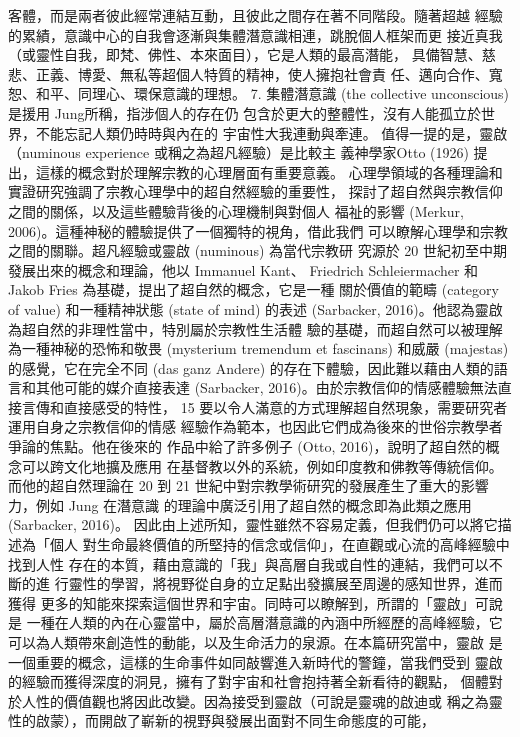 客體，而是兩者彼此經常連結互動，且彼此之間存在著不同階段。隨著超越
經驗的累績，意識中心的自我會逐漸與集體潛意識相連，跳脫個人框架而更
接近真我（或靈性自我，即梵、佛性、本來面目），它是人類的最高潛能，
具備智慧、慈悲、正義、博愛、無私等超個人特質的精神，使人擁抱社會責
任、邁向合作、寬恕、和平、同理心、環保意識的理想。 
7. 集體潛意識 (the collective unconscious) 是援用 Jung所稱，指涉個人的存在仍
包含於更大的整體性，沒有人能孤立於世界，不能忘記人類仍時時與內在的
宇宙性大我連動與牽連。 
值得一提的是，靈啟（numinous experience 或稱之為超凡經驗）是比較主
義神學家Otto (1926) 提出，這樣的概念對於理解宗教的心理層面有重要意義。
心理學領域的各種理論和實證研究強調了宗教心理學中的超自然經驗的重要性，
探討了超自然與宗教信仰之間的關係，以及這些體驗背後的心理機制與對個人
福祉的影響 (Merkur, 2006)。這種神秘的體驗提供了一個獨特的視角，借此我們
可以瞭解心理學和宗教之間的關聯。超凡經驗或靈啟 (numinous) 為當代宗教研
究源於 20 世紀初至中期發展出來的概念和理論，他以 Immanuel Kant、
Friedrich Schleiermacher 和 Jakob Fries 為基礎，提出了超自然的概念，它是一種
關於價值的範疇 (category of value) 和一種精神狀態 (state of mind) 的表述 
(Sarbacker, 2016)。他認為靈啟為超自然的非理性當中，特別屬於宗教性生活體
驗的基礎，而超自然可以被理解為一種神秘的恐怖和敬畏 (mysterium 
tremendum et fascinans) 和威嚴 (majestas) 的感覺，它在完全不同 (das ganz 
Andere) 的存在下體驗，因此難以藉由人類的語言和其他可能的媒介直接表達 
(Sarbacker, 2016)。由於宗教信仰的情感體驗無法直接言傳和直接感受的特性，
15 
要以令人滿意的方式理解超自然現象，需要研究者運用自身之宗教信仰的情感
經驗作為範本，也因此它們成為後來的世俗宗教學者爭論的焦點。他在後來的
作品中給了許多例子 (Otto, 2016)，說明了超自然的概念可以跨文化地擴及應用
在基督教以外的系統，例如印度教和佛教等傳統信仰。而他的超自然理論在 20
到 21 世紀中對宗教學術研究的發展產生了重大的影響力，例如 Jung 在潛意識
的理論中廣泛引用了超自然的概念即為此類之應用  (Sarbacker, 2016)。 
因此由上述所知，靈性雖然不容易定義，但我們仍可以將它描述為「個人
對生命最終價值的所堅持的信念或信仰」，在直觀或心流的高峰經驗中找到人性
存在的本質，藉由意識的「我」與高層自我或自性的連結，我們可以不斷的進
行靈性的學習，將視野從自身的立足點出發擴展至周邊的感知世界，進而獲得
更多的知能來探索這個世界和宇宙。同時可以瞭解到，所謂的「靈啟」可說是
一種在人類的內在心靈當中，屬於高層潛意識的內涵中所經歷的高峰經驗，它
可以為人類帶來創造性的動能，以及生命活力的泉源。在本篇研究當中，靈啟
是一個重要的概念，這樣的生命事件如同敲響進入新時代的警鐘，當我們受到
靈啟的經驗而獲得深度的洞見，擁有了對宇宙和社會抱持著全新看待的觀點，
個體對於人性的價值觀也將因此改變。因為接受到靈啟（可說是靈魂的啟迪或
稱之為靈性的啟蒙），而開啟了嶄新的視野與發展出面對不同生命態度的可能，
